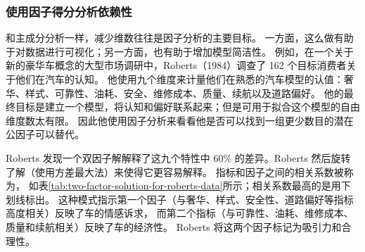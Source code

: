 \begin{table}
    \centering
\end{table}

\subsubsection{使用因子得分分析依赖性}

和主成分分析一样，减少维数往往是因子分析的主要目标。
一方面，这么做有助于对数据进行可视化；另一方面，也有助于增加模型简洁性。
例如，在一个关于新的豪华车概念的大型市场调研中，Roberts（1984）调查了 162 个目标消费者关于他们在汽车的认知。
他使用九个维度来计量他们在熟悉的汽车模型的认值：奢华、样式、可靠性、油耗、安全、维修成本、质量、续航以及道路偏好。
他的最终目标是建立一个模型，将认知和偏好联系起来；但是可用于拟合这个模型的自由维度数太有限。
因此他使用因子分析来看看他是否可以找到一组更少数目的潜在公因子可以替代。

Roberts 发现一个双因子解解释了这九个特性中 60\% 的差异。Roberts 然后旋转了解（使用方差最大法）来使得它更容易解释。
指标和因子之间的相关系数被称为，
如表\ref{tab:two-factor-solution-for-roberts-data}所示；相关系数最高的是用下划线标出。
这种模式指示第一个因子（与奢华、样式、安全性、道路偏好等指标高度相关）反映了车的情感诉求，
而第二个指标（与可靠性、油耗、维修成本、质量和续航相关）反映了车的经济性。
Roberts 将这两个因子标记为吸引力和合理性。

